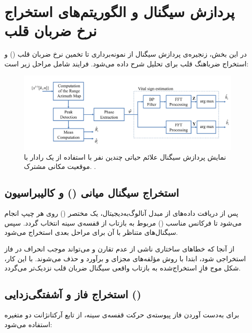 \section{پردازش سیگنال و الگوریتم‌های استخراج نرخ ضربان قلب}
\label{sec:signal-processing-hr-estimation}

در این بخش، زنجیره‌ی پردازش سیگنال از نمونه‌برداری تا تخمین نرخ ضربان قلب () و استخراج ضرباهنگ قلب برای تحلیل  شرح داده می‌شود. فرایند شامل مراحل زیر است:


\begin{figure}[ht]
    \centering
    \includegraphics[width=0.7\linewidth]{Images/chapter3/3-3.png}
    \caption{
   نمایش پردازش سیگنال علائم حیاتی  چندین نفر با استفاده از یک رادار  با موقعیت مکانی مشترک.
    \cite{paterniani2023radar}.}
    \label{fig:fmcw_vitals}
\end{figure}


\subsection{استخراج سیگنال میانی () و کالیبراسیون }
\label{sec:beat-signal-dc-calibration}

پس از دریافت داده‌های  از مبدل آنالوگ‌به‌دیجیتال، یک  مختصر () روی هر چیپ انجام می‌شود تا فرکانس مناسب () مربوط به بازتاب از قفسه‌ی سینه انتخاب گردد. سپس سیگنال‌های  متناظر با آن  برای مراحل بعدی استخراج می‌شود.

از آنجا که خطاهای ساختاری ناشی از عدم تقارن  و  می‌تواند موجب انحراف در فاز استخراجی شود، ابتدا با روش  مؤلفه‌های  مجزای  و  برآورد و حذف می‌شوند. با این کار، شکل موج فازِ استخراج‌شده به بازتاب واقعی سیگنال ضربان قلب نزدیک‌تر می‌گردد.


\subsection{استخراج فاز و آشفتگی‌زدایی ()}
\label{sec:phase-unwrapping}

برای به‌دست آوردن فاز پیوسته‌ی حرکت قفسه‌ی سینه، از تابع آرکتانژانت دو متغیره استفاده می‌شود:

